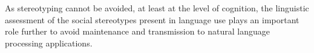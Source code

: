 As stereotyping cannot be avoided, at least at the level of cognition, the linguistic assessment of the social stereotypes present in language use plays an important role further to avoid maintenance and transmission to natural language processing applications. 






